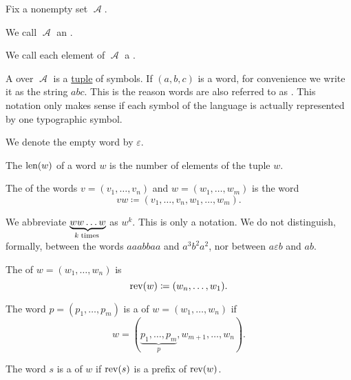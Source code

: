 \begin{definition}\label{def:language}
  Fix a nonempty set \( \mscrA \).

  \begin{thmenum}
     We call \( \mscrA \) an .

     We call each element of \( \mscrA \) a .

     A  over \( \mscrA \) is a \hyperref[def:cartesian_product]{tuple} of symbols. If \( (a, b, c) \) is a word, for convenience we write it as the string \( abc \). This is the reason words are also referred to as . This notation only makes sense if each symbol of the language is actually represented by one typographic symbol.

     We denote the empty word by \( \varepsilon \).

     The  \( \operatorname{len}(w) \) of a word \( w \) is the number of elements of the tuple \( w \).

     The  of the words \( v = (v_1, \ldots, v_n) \) and \( w = (w_1, \ldots, w_m) \) is the word
    \begin{equation*}
      vw \coloneqq (v_1, \ldots, v_n, w_1, \ldots, w_m).
    \end{equation*}

    We abbreviate \( \underbrace{w w \ldots w}_{k \thickspace \text{times} \thickspace} \) as \( w^k \). This is only a notation. We do not distinguish, formally, between the words \( aaabbaa \) and \( a^3 b^2 a^2 \), nor between \( a \varepsilon b \) and \( ab \).

     The  of \( w = (w_1, \ldots, w_n) \) is
    \begin{equation*}
      \operatorname{rev}(w) \coloneqq (w_n, \ldots, w_1).
    \end{equation*}

     The word \( p = (p_1, \ldots, p_m) \) is a  of \( w = (w_1, \ldots, w_n) \) if
    \begin{equation*}
      w = (\underbrace{p_1, \ldots, p_m}_p, w_{m+1}, \ldots, w_n).
    \end{equation*}

     The word \( s \) is a  of \( w \) if \( \operatorname{rev}(s) \) is a prefix of \( \operatorname{rev}(w) \).


\end{thmenum}
\end{definition}
